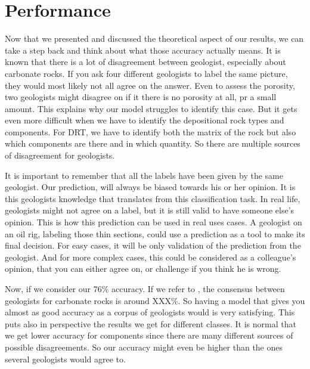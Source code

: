 \section{Performance}
Now that we presented and discussed the theoretical aspect of our results, we can take a step back and think about what those accuracy actually means. It is known that there is a lot of disagreement between geologist, especially about carbonate rocks. If you ask four different geologists to label the same picture, they would most likely not all agree on the answer. 
Even to assess the porosity, two geologists might disagree on if it there is no porosity at all, pr a small amount. This explains why our model struggles to identify this case. But it gets even more difficult when we have to identify the depositional rock types and components. For DRT, we have to identify both the matrix of the rock but also which components are there and in which quantity. So there are multiple sources of disagreement for geologists. 

It is important to remember that all the labels have been given by the same geologist. Our prediction, will always be biased towards his or her opinion. It is this geologists knowledge that translates from this classification task. In real life, geologists might not agree on a label, but it is still valid to have someone else's opinion. This is how this prediction can be used in real uses cases. A geologist on an oil rig, labeling those thin sections, could use a prediction as a tool to make its final decision. For easy cases, it will be only validation of the prediction from the geologist. And for more complex cases, this could be considered as a colleague's opinion, that you can either agree on, or challenge if you think he is wrong. 

Now, if we consider our 76\% accuracy. If we refer to \cite{thesis_imperial}, the consensus between geologists for carbonate rocks is around XXX\%. So having a model that gives you almost as good accuracy as a corpus of geologists would is very satisfying. This puts also in perspective the results we get for different classes. It is normal that we get lower accuracy for components since there are many different sources of possible disagreements. So our accuracy might even be higher than the ones several geologists would agree to. 
